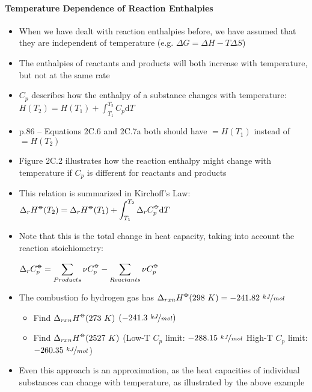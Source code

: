 \documentclass[12pt, openany, letterpaper]{memoir}
\begin{document}
\paragraph{Temperature Dependence of Reaction Enthalpies}
\begin{itemize}
	\item When we have dealt with reaction enthalpies before, we have assumed that they are independent of temperature (e.g. $\Delta G = \Delta H-T\Delta S$)
	\item The enthalpies of reactants and products will both increase with temperature, but not at the same rate
	\item $C_{p}$ describes how the enthalpy of a substance changes with temperature:
	$H(T_2)=H(T_1)+\displaystyle\int_{T_1}^{T_2}C_p\mathrm{d}T$
	\item p.86 -- Equations 2C.6 and 2C.7a both should have $=H(T_1)$  instead of $=H(T_2)$
	\item Figure 2C.2 illustrates how the reaction enthalpy might change with temperature if $C_p$ is different for reactants and products
	\item This relation is summarized in Kirchoff's Law: $\Delta_rH^{\std}(T_2)=\Delta_rH^{\std}(T_1)+\displaystyle\int_{T_1}^{T_2}\Delta_rC_p^{\std}\mathrm{d}T$
	\item Note that this is the total change in heat capacity, taking into account the reaction stoichiometry:
	
	$\Delta_rC_p^{\std}=\displaystyle\sum\limits_{Products}\nu C_p^{\std} - \displaystyle\sum\limits_{Reactants}\nu C_p^{\std}$
	\item The combustion fo hydrogen gas has $\Delta_{rxn}H^{\std}(298~K)=-241.82~\nicefrac{kJ}{mol}$
	\begin{itemize}
		\item Find $\Delta_{rxn}H^{\std}(273~K)$ $\left(-241.3~\nicefrac{kJ}{mol}\right)$
		\item Find $\Delta_{rxn}H^{\std}(2527~K)$ (Low-T $C_p$ limit: $-288.15~\nicefrac{kJ}{mol}$ High-T $C_p$ limit: $-260.35~\nicefrac{kJ}{mol}$)
	\end{itemize}
	\item Even this approach is an approximation, as the heat capacities of individual substances can change with temperature, as illustrated by the above example
\end{itemize}
\end{document}
